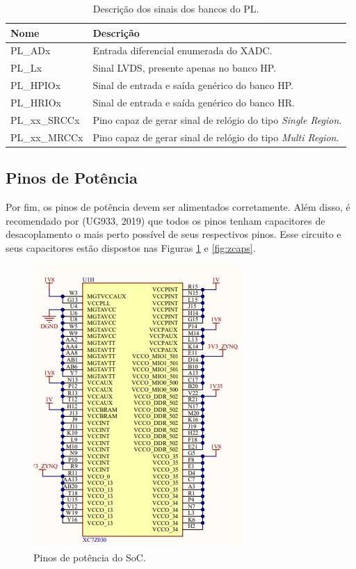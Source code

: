 \begin{table}[H]
	\ABNTEXfontereduzida
	\caption{\label{tab:plzynq}Descrição dos sinais dos bancos do PL.}
    \centering
    \begin{tabular}{@{} >{\centering}p{4cm} >{\centering}p{8cm} @{}}
    
		\toprule
		\textbf{Nome} & \textbf{Descrição} \tabularnewline 
        \midrule
         PL\_ADx & Entrada diferencial enumerada do XADC. \tabularnewline
        \midrule
         PL\_Lx & Sinal LVDS, presente apenas no banco HP. \tabularnewline
        \midrule
         PL\_HPIOx & Sinal de entrada e saída genérico do banco HP.  \tabularnewline
        \midrule
        PL\_HRIOx  & Sinal de entrada e saída genérico do banco HR. \tabularnewline
        \midrule
        PL\_xx\_SRCCx & Pino capaz de gerar sinal de relógio do tipo \textit{Single Region}. \tabularnewline
        \midrule
        PL\_xx\_MRCCx & Pino capaz de gerar sinal de relógio do tipo \textit{Multi Region}. \tabularnewline
        \bottomrule
	\end{tabular}
\end{table}

\subsection{Pinos de Potência}

Por fim, os pinos de potência devem ser alimentados corretamente. Além disso, é recomendado por (UG933, 2019) que todos os pinos tenham capacitores de desacoplamento o mais perto possível de seus respectivos pinos. Esse circuito e seus capacitores estão dispostos nas Figuras \ref{fig:zpower} e \ref{fig:zcaps}.

\begin{figure}[H]
    \centering
    \includegraphics[scale=0.7]{images/zynqpower.png}
    \caption{Pinos de potência do SoC.}
    \label{fig:zpower}
\end{figure}

